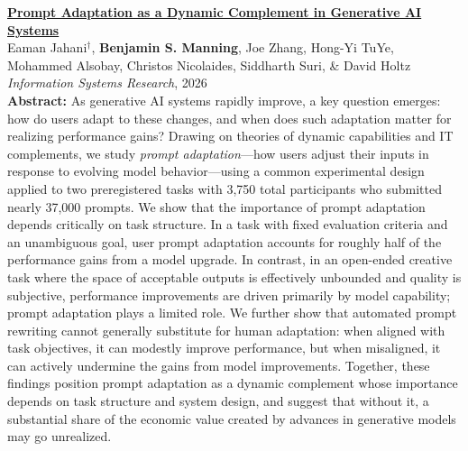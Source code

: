 \documentclass[11pt]{article}
\newenvironment{publist}
  {\begin{list}{}{%
    \setlength{\leftmargin}{1.5em}%
    \setlength{\itemindent}{-1.5em}%
    \setlength{\itemsep}{10pt}%
    \setlength{\parsep}{0pt}%
    \setlength{\topsep}{4pt}}}
  {\end{list}}
\begin{document}
\begin{publist}
\item \href{https://pubsonline.informs.org/doi/full/10.1287/isre.2025.2029}{\textbf{Prompt Adaptation as a Dynamic Complement in Generative AI Systems}}\\
Eaman Jahani$^\dagger$, \textbf{Benjamin S. Manning}, Joe Zhang, Hong-Yi TuYe, Mohammed Alsobay, Christos Nicolaides, Siddharth Suri, \& David Holtz\\
\textit{Information Systems Research}, 2026\\[3pt]
{\footnotesize \textbf{Abstract: }As generative AI systems rapidly improve, a key question emerges: how do users adapt to these changes, and when does such adaptation matter for realizing performance gains? Drawing on theories of dynamic capabilities and IT complements, we study \textit{prompt adaptation}---how users adjust their inputs in response to evolving model behavior---using a common experimental design applied to two preregistered tasks with 3,750 total participants who submitted nearly 37,000 prompts. We show that the importance of prompt adaptation depends critically on task structure. In a task with fixed evaluation criteria and an unambiguous goal, user prompt adaptation accounts for roughly half of the performance gains from a model upgrade. In contrast, in an open-ended creative task where the space of acceptable outputs is effectively unbounded and quality is subjective, performance improvements are driven primarily by model capability; prompt adaptation plays a limited role. We further show that automated prompt rewriting cannot generally substitute for human adaptation: when aligned with task objectives, it can modestly improve performance, but when misaligned, it can actively undermine the gains from model improvements. Together, these findings position prompt adaptation as a dynamic complement whose importance depends on task structure and system design, and suggest that without it, a substantial share of the economic value created by advances in generative models may go unrealized.}


\end{publist}
\end{document}
